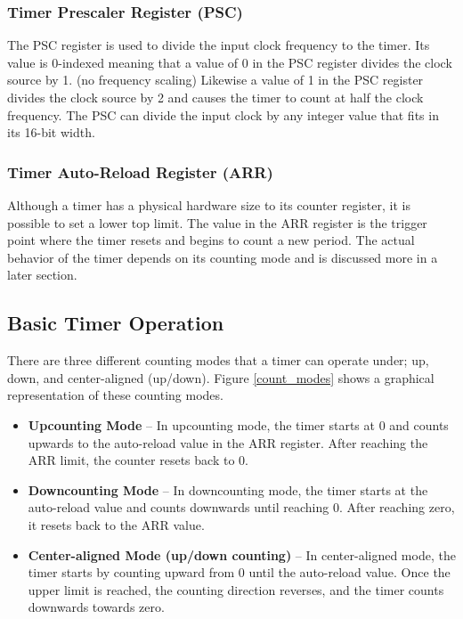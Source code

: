 \documentclass[openany,11pt,fleqn]{book} %
\begin{document}
    \subsubsection{Timer Prescaler Register (PSC)}
    The PSC register is used to divide the input clock frequency to the timer. Its value is 0-indexed meaning that a value of 0 in the PSC register divides the clock source by 1. (no frequency scaling) Likewise a value of 1 in the PSC register divides the clock source by 2 and causes the timer to count at half the clock frequency. The PSC can divide the input clock by any integer value that fits in its 16-bit width.  
    \subsubsection{Timer Auto-Reload Register (ARR)}
     Although a timer has a physical hardware size to its counter register, it is possible to set a lower top limit. The value in the ARR register is the trigger point where the timer resets and begins to count a new period. The actual behavior of the timer depends on its counting mode and is discussed more in a later section. 

    
    \subsection{Basic Timer Operation}
    
    There are three different counting modes that a timer can operate under; up, down, and center-aligned (up/down). Figure \ref{count_modes} shows a graphical representation of these counting modes.  
    
    \begin{itemize}
        \item \textbf{Upcounting Mode} --  In upcounting mode, the timer starts at 0 and counts upwards to the auto-reload value in the ARR register. After reaching the ARR limit, the counter resets back to 0. 
        \item \textbf{Downcounting Mode} -- In downcounting mode, the timer starts at the auto-reload value and counts downwards until reaching 0. After reaching zero, it resets back to the ARR value.
        \item \textbf{Center-aligned Mode (up/down counting)} -- In center-aligned mode, the timer starts by counting upward from 0 until the auto-reload value. Once the upper limit is reached, the counting direction reverses, and the timer counts downwards towards zero.
    \end{itemize}
\end{document}
